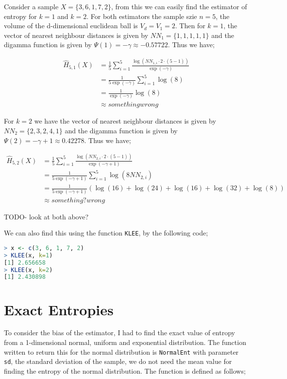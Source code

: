 \documentclass{report}
\begin{document}
Consider a sample $X = \{3, 6, 1, 7, 2\}$, from this we can easily find the estimator of entropy for $k=1$ and $k=2$. For both estimators the sample szie $n=5$, the volume of the d-dimensional euclidean ball is $V_{d} = V_{1} = 2$. Then for $k=1$, the vector of nearest neighbour distances is given by $NN_{1} = \{1, 1, 1, 1, 1\}$ and the digamma function is given by $\Psi(1) = -\gamma \approx -0.57722$. Thus we have;

\begin{align*}
\hat{H}_{5, 1} (X) &= \frac{1}{5} \sum_{i=1}^{5} \frac{\log(NN_{1, i} \cdot 2 \cdot (5-1))}{\exp(-\gamma)} \\
&=\frac{1}{5 \exp(-\gamma)} \sum_{i=1}^{5} \log(8) \\
&= \frac{1}{\exp(-\gamma)} \log(8) \\
&\approx something wrong
\end{align*}

For $k=2$ we have the vector of nearest neighbour distances is given by $NN_{2} = \{2, 3, 2, 4, 1\}$ and the digamma function is given by $\Psi(2) = -\gamma + 1 \approx 0.42278$. Thus we have;

\begin{align*}
\hat{H}_{5, 2} (X) &= \frac{1}{5} \sum_{i=1}^{5} \frac{\log(NN_{2, i} \cdot 2 \cdot (5-1))}{\exp(-\gamma + 1)} \\
&=\frac{1}{5 \exp(-\gamma + 1)} \sum_{i=1}^{5} \log(8 NN_{2, i}) \\
&= \frac{1}{5 \exp(-\gamma + 1)} \left(\log(16) + \log(24) + \log(16) + \log(32) + \log(8) \right)\\
&\approx something? wrong
\end{align*}


TODO- look at both above?

We can also find this using the function \texttt{KLEE}, by the following code;
\begin{lstlisting}[language=R]
> x <- c(3, 6, 1, 7, 2)
> KLEE(x, k=1)
[1] 2.656658
> KLEE(x, k=2)
[1] 2.430898
\end{lstlisting}




\section{Exact Entropies}

To consider the bias of the estimator, I had to find the exact value of entropy from a 1-dimensional normal, uniform and exponential distribution. The function written to return this for the normal distribution is \texttt{NormalEnt} with parameter \texttt{sd}, the standard deviation of the sample, we do not need the mean value for finding the entropy of the normal distribution. The function is defined as follows;
\end{document}

